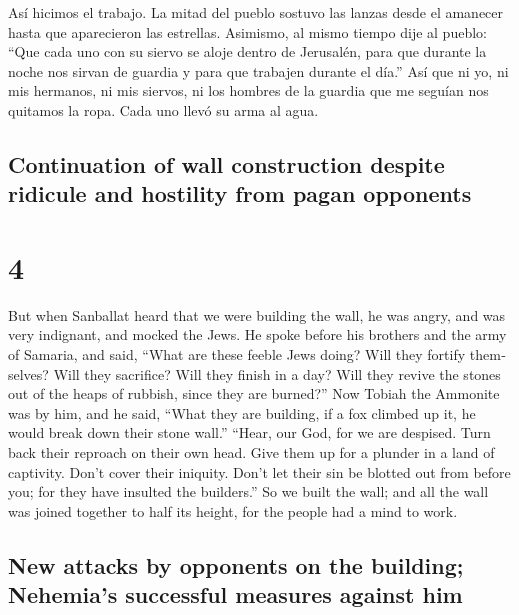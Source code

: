 \begin{paracol}{2}
 Así hicimos el trabajo. La mitad del pueblo sostuvo las
lanzas desde el amanecer hasta que aparecieron las estrellas.
 Asimismo, al mismo tiempo dije al pueblo: ``Que cada uno
con su siervo se aloje dentro de Jerusalén, para que durante la noche
nos sirvan de guardia y para que trabajen durante el día.''
 Así que ni yo, ni mis hermanos, ni mis siervos, ni los
hombres de la guardia que me seguían nos quitamos la ropa. Cada uno
llevó su arma al agua.

\switchcolumn
\begin{otherlanguage}{english}

\hypertarget{continuation-of-wall-construction-despite-ridicule-and-hostility-from-pagan-opponents}{%
\subsection{Continuation of wall construction despite ridicule and
hostility from pagan
opponents}\label{continuation-of-wall-construction-despite-ridicule-and-hostility-from-pagan-opponents}}

\hypertarget{section-7}{%
\section{4}\label{section-7}}

 But when Sanballat heard that we were building the wall,
he was angry, and was very indignant, and mocked the Jews.
 He spoke before his brothers and the army of Samaria, and
said, ``What are these feeble Jews doing? Will they fortify themselves?
Will they sacrifice? Will they finish in a day? Will they revive the
stones out of the heaps of rubbish, since they are burned?''
 Now Tobiah the Ammonite was by him, and he said, ``What
they are building, if a fox climbed up it, he would break down their
stone wall.''  ``Hear, our God, for we are despised. Turn
back their reproach on their own head. Give them up for a plunder in a
land of captivity.  Don't cover their iniquity. Don't let
their sin be blotted out from before you; for they have insulted the
builders.''  So we built the wall; and all the wall was
joined together to half its height, for the people had a mind to work.

\hypertarget{new-attacks-by-opponents-on-the-building-nehemias-successful-measures-against-him}{%
\subsection{New attacks by opponents on the building; Nehemia's
successful measures against
him}\label{new-attacks-by-opponents-on-the-building-nehemias-successful-measures-against-him}}


\end{otherlanguage}
\end{paracol}
